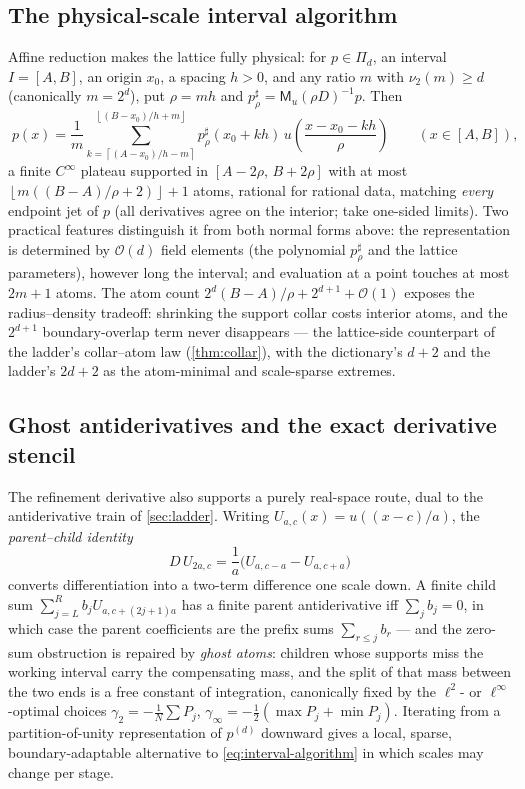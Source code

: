 \documentclass[11pt,oneside]{article}
\numberwithin{equation}{section}
\theoremstyle{definition}
\theoremstyle{remark}
\newcommand{\bigO}{\mathcal O}
\newcommand{\vtwo}{\nu_2}
\newcommand{\floor}[1]{\left\lfloor #1\right\rfloor}
\newcommand{\ceil}[1]{\left\lceil #1\right\rceil}
\newcommand{\MM}{\mathsf M}
\newcommand{\PiD}{\Pi_d}
\begin{document}
\subsection{The physical-scale interval algorithm}

Affine reduction makes the lattice fully physical: for
$p\in\PiD$, an interval $I=[A,B]$, an origin $x_0$, a spacing $h>0$,
and any ratio $m$ with $\vtwo(m)\ge d$ (canonically $m=2^{d}$), put
$\rho=mh$ and
$p^{\sharp}_\rho=\MM_u(\rho D)^{-1}p$.  Then
\begin{equation}
 \boxed{\;
 p(x)=\frac1m
 \sum_{k=\ceil{(A-x_0)/h-m}}^{\floor{(B-x_0)/h+m}}
 p^{\sharp}_\rho(x_0+kh)\,
 u\!\left(\frac{x-x_0-kh}{\rho}\right)
 \qquad(x\in[A,B]),
 \;}
 \label{eq:interval-algorithm}
\end{equation}
a finite $C^\infty$ plateau supported in $[A-2\rho,\,B+2\rho]$ with
at most $\floor{m((B-A)/\rho+2)}+1$ atoms, rational for rational
data, matching \emph{every} endpoint jet of $p$ (all derivatives
agree on the interior; take one-sided limits).  Two practical
features distinguish it from both normal forms above: the
representation is determined by $\bigO(d)$ field elements (the
polynomial $p^{\sharp}_\rho$ and the lattice parameters), however
long the interval; and evaluation at a point touches at most
$2m+1$ atoms.  The atom count
$2^{d}(B-A)/\rho+2^{d+1}+\bigO(1)$ exposes the radius--density
tradeoff: shrinking the support collar costs interior atoms, and the
$2^{d+1}$ boundary-overlap term never disappears --- the lattice-side
counterpart of the ladder's collar--atom law
(\cref{thm:collar}), with the dictionary's $d+2$ and the ladder's
$2d+2$ as the atom-minimal and scale-sparse extremes.

\subsection{Ghost antiderivatives and the exact derivative stencil}

The refinement derivative also supports a purely real-space route,
dual to the antiderivative train of \cref{sec:ladder}.  Writing
$U_{a,c}(x)=u((x-c)/a)$, the \emph{parent--child identity}
\begin{equation}
 D\,U_{2a,c}
 =\frac1a\bigl(U_{a,c-a}-U_{a,c+a}\bigr)
 \label{eq:parent-child}
\end{equation}
converts differentiation into a two-term difference one scale down.
A finite child sum $\sum_{j=L}^{R}b_jU_{a,c+(2j+1)a}$ has a finite
parent antiderivative iff $\sum_jb_j=0$, in which case the parent
coefficients are the prefix sums $\sum_{r\le j}b_r$ --- and the
zero-sum obstruction is repaired by \emph{ghost atoms}: children
whose supports miss the working interval carry the compensating
mass, and the split of that mass between the two ends is a free
constant of integration, canonically fixed by the
$\ell^{2}$- or $\ell^\infty$-optimal choices
$\gamma_2=-\frac1N\sum P_j$,
$\gamma_\infty=-\tfrac12(\max P_j+\min P_j)$.  Iterating from a
partition-of-unity representation of $p^{(d)}$ downward gives a
local, sparse, boundary-adaptable alternative to
\eqref{eq:interval-algorithm} in which scales may change per stage.
\end{document}
